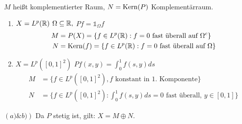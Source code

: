 \begin{vereinbarung}
	$M$ hei{\ss}t komplementierter Raum, $N = \mathop{\rm Kern}\nolimits(P)$ Komplementärraum.
\end{vereinbarung}


\begin{beispiel*}
	\begin{enumerate}[label=\alph*\upshape)]
		\item $X = L^{p}(\mathbb{R})$ $\Omega \subseteq \mathbb{R},$ $P f = \mathds{1}_{\Omega} f$
			\begin{align*}
				M & = P(X) = \{ f \in L^{p}(\mathbb{R}): f = 0 \text{ fast überall auf } \Omega^{c} \} \\
				N & = \mathop{\rm Kern}\nolimits(f) = \{ f \in L^{p}(\mathbb{R}): f = 0 \text{ fast überall auf } \Omega \}
			\end{align*} 
		\item $X = L^{p}([0, 1]^{2})$ $P f(x, y) = \int_{0}^{1} f(s, y) ds$
			\begin{align*}
				M & = \{ f \in L^{p}([0, 1]^{2}), f \text{ konstant in 1. Komponente} \} \\
				N & = \{ f \in L^{p}([0, 1]^{2}): \int_{0}^{1} f(s, y) ds = 0 \text{ fast überall, } y \in [0, 1] \}
			\end{align*}
	\end{enumerate}
	$\left( a) \& b) \right)$ Da $P$ stetig ist, gilt: $X = M \oplus N$.
\end{beispiel*}



\newpage